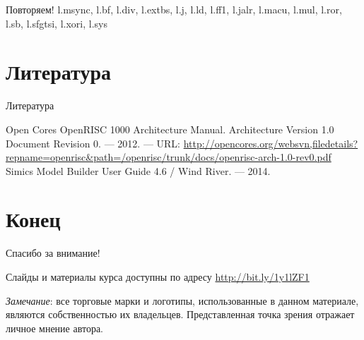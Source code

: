 \documentclass{beamer}
\begin{document}
\begin{frame}{Повторяем!}
l.msync, l.bf, l.div, l.extbs, l.j, l.ld, l.ff1, l.jalr, l.macu, l.mul, l.ror, l.sb, l.sfgtsi, l.xori, l.sys

\end{frame}

\section{Литература}

\begin{frame}[allowframebreaks]{Литература}
\begin{thebibliography}{99}
	  Open Cores OpenRISC 1000 Architecture Manual. Architecture Version 1.0 Document Revision 0. — 2012. — URL: \url{http://opencores.org/websvn,filedetails?repname=openrisc&path=/openrisc/trunk/docs/openrisc-arch-1.0-rev0.pdf}
	 Simics Model Builder User Guide 4.6 / Wind River. — 2014.
	
\end{thebibliography}
\end{frame}


\section{Конец}
\begin{frame}

{\huge{Спасибо за внимание!}\par}

\vfill

Слайды и материалы курса доступны по адресу \url{http://bit.ly/1y1lZF1} %

\vfill

\tiny{\textit{Замечание}: все торговые марки и логотипы, использованные в данном материале, являются собственностью их владельцев. Представленная точка зрения отражает личное мнение автора.
}

\end{frame}

\end{document}
